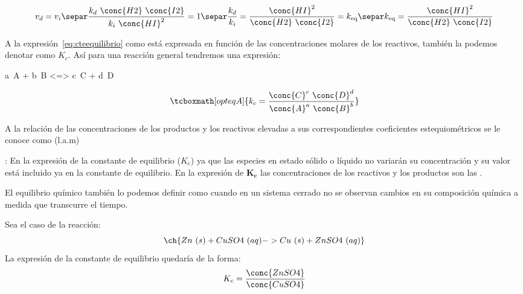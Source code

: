    \begin{gather}
        v_d = v_i \notag \separ
        \dfrac{k_d\ \conc{H2}\ \conc{I2}}{k_i\ \conc{HI}^2} = 1 \notag \separ
        \dfrac{k_d}{k_i} = \dfrac{\conc{HI}^2}{\conc{H2}\ \conc{I2}} = k_{\text{eq}} \notag  \separ
        k_{\text{eq}} = \dfrac{\conc{HI}^2}{\conc{H2}\ \conc{I2}} \label{eq:cteequilibrio}
    \end{gather}

    A la expresión~\eqref{eq:cteequilibrio} como está expresada en función de las concentraciones molares de los reactivos, también la podemos denotar como $K_c$.
    Así para una reacción general tendremos una expresión:
    \begin{reaction}
        a\ A\gas{} + b\ B \gas{} <=> c\ C \gas{} + d\ D\gas{} \label{rxn:reacciongeneral}
    \end{reaction}

    \begin{equation}
        \tcboxmath[opteqA]{k_c= \dfrac{\conc{C}^c\ \conc{D}^d }{\conc{A}^a\ \conc{B}^b}}
    \end{equation}

    A la relación de las concentraciones de los productos y los reactivos elevadas a sus correspondientes coeficientes estequiométricos se le conoce como  (l.a.m)


    : En la expresión de la constante de equilibrio (\( K_c \))  ya que las especies en estado sólido o líquido no variarán su concentración y su valor está incluido ya en la constante de equilibrio.
    En la expresión de $\bm{K_c}$ las concentraciones de los reactivos y los productos son las .

    El equilibrio químico también lo podemos definir como cuando en un sistema cerrado no se observan cambios en su composición química a medida que transcurre el tiempo.

    \begin{example}
        Sea el caso de la reacción:
        \begin{equation*}
            \ch{Zn\ (s) + CuSO4 \ (aq) -> Cu \ (s) + ZnSO4\ (aq)}
        \end{equation*}
        La expresión de la constante de equilibrio quedaría de la forma:
        \begin{equation*}
            K_c = \dfrac{\conc{ZnSO4}}{\conc{CuSO4}}
        \end{equation*}
    \end{example}

